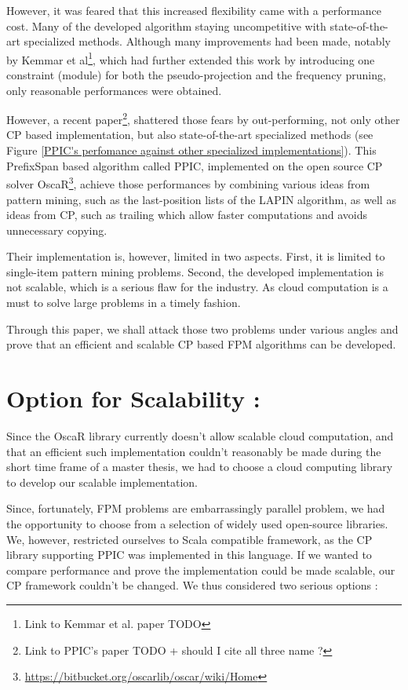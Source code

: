 \documentclass{eplmastersthesis}
\begin{document}
However, it was feared that this increased flexibility came with a performance cost. Many of the developed algorithm staying uncompetitive with state-of-the-art specialized methods. Although many improvements had been made, notably by Kemmar et al\footnote{Link to Kemmar et al. paper TODO}, which had further extended this work by introducing one constraint (module) for both the pseudo-projection and the frequency pruning, only reasonable performances were obtained. \newline

However, a recent paper\footnote{Link to PPIC's paper TODO + should I cite all three name ?}, shattered those fears by out-performing, not only other CP based implementation, but also state-of-the-art specialized methods (see Figure \ref{PPIC's perfomance against other specialized implementations}). This PrefixSpan based algorithm called PPIC, implemented on the open source CP solver OscaR\footnote{\url{https://bitbucket.org/oscarlib/oscar/wiki/Home}}, achieve those performances by combining various ideas from pattern mining, such as the last-position lists of the LAPIN algorithm, as well as ideas from CP, such as trailing which allow faster computations and avoids unnecessary copying. \newline

Their implementation is, however, limited in two aspects. First, it is limited to single-item pattern mining problems. Second, the developed implementation is not scalable, which is a serious flaw for the industry. As cloud computation is a must to solve large problems in a timely fashion. \newline

Through this paper, we shall attack those two problems under various angles and prove that an efficient and scalable CP based FPM algorithms can be developed.

\section{Option for Scalability :}

Since the OscaR library currently doesn't allow scalable cloud computation, and that an efficient such implementation couldn't reasonably be made during the short time frame of a master thesis, we had to choose a cloud computing library to develop our scalable implementation. \newline

Since, fortunately, FPM problems are embarrassingly parallel problem, we had the opportunity to choose from a selection of widely used open-source libraries. We, however, restricted ourselves to Scala compatible framework, as the CP library supporting PPIC was implemented in this language. If we wanted to compare performance and prove the implementation could be made scalable, our CP framework couldn't be changed. We thus considered two serious options :
\end{document}
